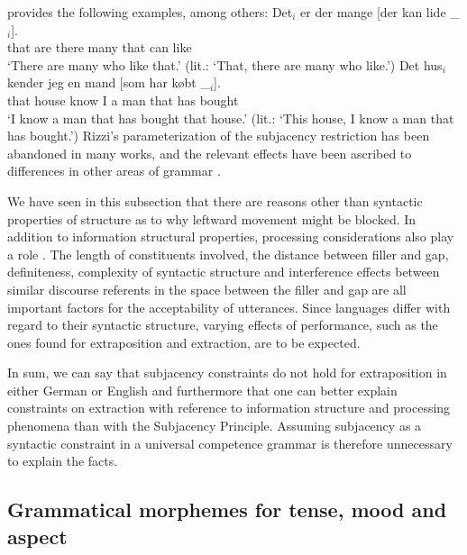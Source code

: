 \citet[]{Erteschik73a-u} provides the following examples, among others:
\eal
\label{Beispiel-Extraktion-Adjunkt}
\ex
\gll Det$_i$ er   der mange [der kan lide \_$_i$].\\
     that are there  many \hspaceThis{[}that can like\\
\glt `There are many who like that.' (lit.: `That, there are many who like.')
\ex
\gll Det    hus$_i$  kender jeg en    mand [som har købt \_$_i$].\\
     that   house  know  I a man \hspaceThis{[}that has bought\\
\glt `I know a man that has bought that house.' (lit.: `This house, I know a man that has bought.')
\zl
\noindent 
Rizzi's parameterization of the subjacency restriction has been abandoned in many works, and the relevant effects have been
ascribed to differences in other areas of grammar \citep{Adams84a,CMC83a,Grimshaw86b,Kluender92a}.

We have seen in this subsection that there are reasons other than syntactic properties of structure as to why leftward movement might be blocked.
In addition to information structural properties, processing considerations\label{Seite-Subjazenz-Performanz}
also play a role \citep*{Grosu73a,EC2000a,Gibson98a,KK93a,Hawkins99a,SHS2007a}.
The length of constituents involved, the distance between filler and gap, definiteness, complexity of syntactic structure and
interference effects between similar discourse referents in the space between the filler and gap are all important factors for
the acceptability of utterances. Since languages differ with regard to their syntactic structure,
varying effects of performance, such as the ones found for extraposition and extraction, are to be expected. 

In sum, we can say that subjacency constraints do not hold for extraposition in either German or English and furthermore that one can better
explain constraints on extraction with reference to information structure and processing phenomena than with the Subjacency Principle.
Assuming subjacency as a syntactic constraint in a universal competence grammar is therefore unnecessary to explain the facts.

\subsection{Grammatical morphemes for tense, mood and aspect}


